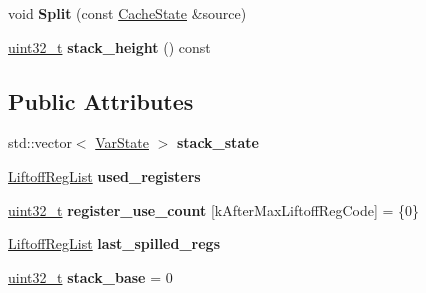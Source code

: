 \begin{DoxyCompactItemize}
\item 
\mbox{\label{structv8_1_1internal_1_1wasm_1_1LiftoffAssembler_1_1CacheState_a7de3159aaa95dc902b9ed7179762d7e9}} 
void {\bfseries Split} (const \mbox{\hyperlink{structv8_1_1internal_1_1wasm_1_1LiftoffAssembler_1_1CacheState}{Cache\+State}} \&source)
\item 
\mbox{\label{structv8_1_1internal_1_1wasm_1_1LiftoffAssembler_1_1CacheState_a35fd415b19981b549128a74d5eb6cbd3}} 
\mbox{\hyperlink{classuint32__t}{uint32\+\_\+t}} {\bfseries stack\+\_\+height} () const
\end{DoxyCompactItemize}
\subsection*{Public Attributes}
\begin{DoxyCompactItemize}
\item 
\mbox{\label{structv8_1_1internal_1_1wasm_1_1LiftoffAssembler_1_1CacheState_a07476cda8a7cbc4bf0b1c3234e0c9821}} 
std\+::vector$<$ \mbox{\hyperlink{classv8_1_1internal_1_1wasm_1_1LiftoffAssembler_1_1VarState}{Var\+State}} $>$ {\bfseries stack\+\_\+state}
\item 
\mbox{\label{structv8_1_1internal_1_1wasm_1_1LiftoffAssembler_1_1CacheState_ad39cb865a21d3afcbdcffc691f400362}} 
\mbox{\hyperlink{classv8_1_1internal_1_1wasm_1_1LiftoffRegList}{Liftoff\+Reg\+List}} {\bfseries used\+\_\+registers}
\item 
\mbox{\label{structv8_1_1internal_1_1wasm_1_1LiftoffAssembler_1_1CacheState_a0a053f00d7cdd700b68e14f698301c13}} 
\mbox{\hyperlink{classuint32__t}{uint32\+\_\+t}} {\bfseries register\+\_\+use\+\_\+count} \mbox{[}k\+After\+Max\+Liftoff\+Reg\+Code\mbox{]} = \{0\}
\item 
\mbox{\label{structv8_1_1internal_1_1wasm_1_1LiftoffAssembler_1_1CacheState_a4807fc139516c831af01ceca9ef87e38}} 
\mbox{\hyperlink{classv8_1_1internal_1_1wasm_1_1LiftoffRegList}{Liftoff\+Reg\+List}} {\bfseries last\+\_\+spilled\+\_\+regs}
\item 
\mbox{\label{structv8_1_1internal_1_1wasm_1_1LiftoffAssembler_1_1CacheState_a150fcf755276c2a335cf3f96acf45fb6}} 
\mbox{\hyperlink{classuint32__t}{uint32\+\_\+t}} {\bfseries stack\+\_\+base} = 0
\end{DoxyCompactItemize}



